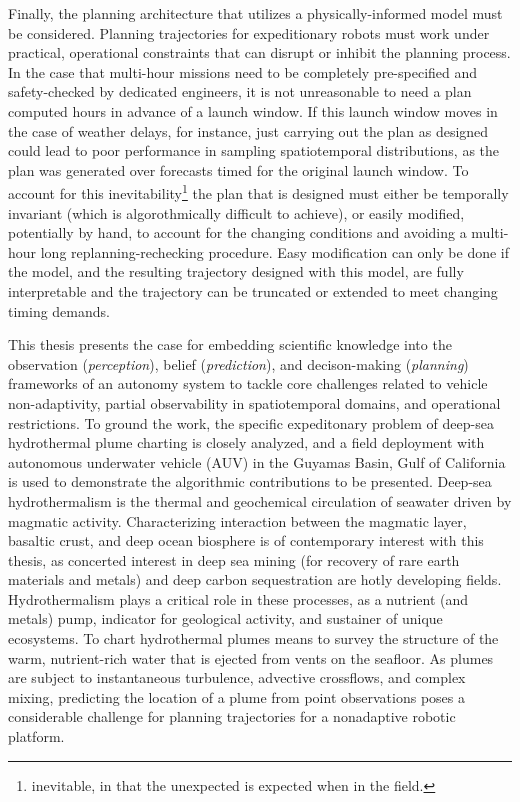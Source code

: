 Finally, the planning architecture that utilizes a physically-informed model must be considered.
Planning trajectories for expeditionary robots must work under practical, operational constraints that can disrupt or inhibit the planning process.
In the case that multi-hour missions need to be completely pre-specified and safety-checked by dedicated engineers, it is not unreasonable to need a plan computed hours in advance of a launch window. 
If this launch window moves in the case of weather delays, for instance, just carrying out the plan as designed could lead to poor performance in sampling spatiotemporal distributions, as the plan was generated over forecasts timed for the original launch window.
To account for this inevitability\footnote{inevitable, in that the unexpected is expected when in the field.} the plan that is designed must either be temporally invariant (which is algorothmically difficult to achieve), or easily modified, potentially by hand, to account for the changing conditions and avoiding a multi-hour long replanning-rechecking procedure.
Easy modification can only be done if the model, and the resulting trajectory designed with this model, are fully interpretable and the trajectory can be truncated or extended to meet changing timing demands.

This thesis presents the case for embedding scientific knowledge into the observation (\emph{perception}), belief (\emph{prediction}), and decison-making (\emph{planning}) frameworks of an autonomy system to tackle core challenges related to vehicle non-adaptivity, partial observability in spatiotemporal domains, and operational restrictions. 
To ground the work, the specific expeditonary problem of deep-sea hydrothermal plume charting is closely analyzed, and a field deployment with autonomous underwater vehicle (AUV) \Sentry in the Guyamas Basin, Gulf of California is used to demonstrate the algorithmic contributions to be presented.
Deep-sea hydrothermalism is the thermal and geochemical circulation of seawater driven by magmatic activity.
Characterizing interaction between the magmatic layer, basaltic crust, and deep ocean biosphere is of contemporary interest with this thesis, as concerted interest in deep sea mining (for recovery of rare earth materials and metals) and deep carbon sequestration are hotly developing fields.
Hydrothermalism plays a critical role in these processes, as a nutrient (and metals) pump, indicator for geological activity, and sustainer of unique ecosystems.
To chart hydrothermal plumes means to survey the structure of the warm, nutrient-rich water that is ejected from vents on the seafloor.
As plumes are subject to instantaneous turbulence, advective crossflows, and complex mixing, predicting the location of a plume from point observations poses a considerable challenge for planning trajectories for a nonadaptive robotic platform.
 
